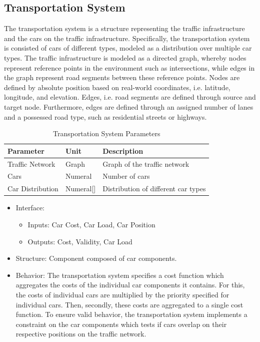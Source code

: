 \subsection{Transportation System}

The transportation system is a structure representing the traffic infrastructure and the cars on the traffic infrastructure. Specifically, the transportation system is consisted of cars of different types, modeled as a distribution over multiple car types. The traffic infrastructure is modeled as a directed graph, whereby nodes represent reference points in the environment such as intersections, while edges in the graph represent road segments between these reference points. Nodes are defined by absolute position based on real-world coordinates, i.e. latitude, longitude, and elevation. Edges, i.e. road segments are defined through source and target node. Furthermore, edges are defined through an assigned number of lanes and a possessed road type, such as residential streets or highways.

\begin{table}[h]
	\renewcommand{\arraystretch}{1.3}
	\caption{Transportation System Parameters}
	\centering
	\begin{tabular}{lll}
		\hline
		\textbf{Parameter}              & \textbf{Unit}		 & \textbf{Description} \\ \hline
		Traffic Network                 & Graph          	 & Graph of the traffic network      \\
		Cars                  			& Numeral   		 & Number of cars      \\ 
		Car Distribution                & Numeral[]   		 & Distribution of different car types      \\ \hline
	\end{tabular}
\end{table}
\begin{itemize}
	\item Interface:
	\begin{itemize}
		\item Inputs: Car Cost, Car Load, Car Position
		\item Outputs: Cost, Validity, Car Load
	\end{itemize}	 
	\item Structure: Component composed of car components.
	\item Behavior: The transportation system specifies a cost function which aggregates the costs of the individual car components it contains. For this, the costs of individual cars are multiplied by the priority specified for individual cars. Then, secondly, these costs are aggregated to a single cost function.
	To ensure valid behavior, the transportation system implements a constraint on the car components which tests if cars overlap on their respective positions on the traffic network. 
	
\end{itemize}

